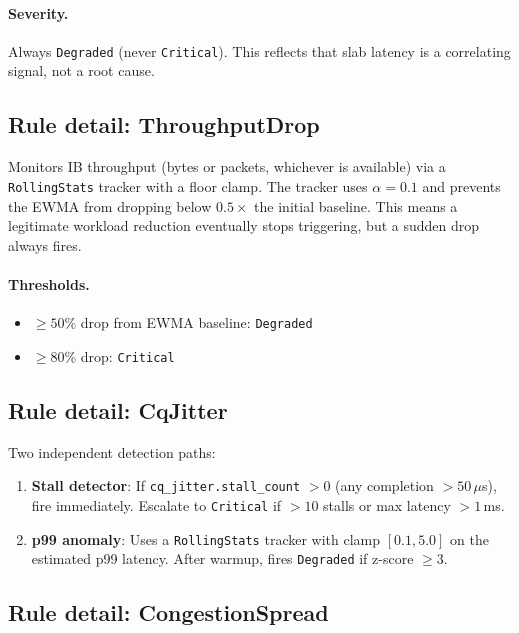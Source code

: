 \documentclass[11pt]{article}
\begin{document}
\paragraph{Severity.}
Always \texttt{Degraded} (never \texttt{Critical}). This reflects that slab
latency is a correlating signal, not a root cause.

\subsection{Rule detail: ThroughputDrop}

Monitors IB throughput (bytes or packets, whichever is available) via a
\texttt{RollingStats} tracker with a floor clamp. The tracker uses
$\alpha = 0.1$ and prevents the EWMA from dropping below $0.5\times$ the
initial baseline. This means a legitimate workload reduction eventually
stops triggering, but a sudden drop always fires.

\paragraph{Thresholds.}
\begin{itemize}[nosep]
  \item $\geq 50$\% drop from EWMA baseline: \texttt{Degraded}
  \item $\geq 80$\% drop: \texttt{Critical}
\end{itemize}

\subsection{Rule detail: CqJitter}

Two independent detection paths:

\begin{enumerate}[nosep]
  \item \textbf{Stall detector}: If \texttt{cq\_jitter.stall\_count} $> 0$
    (any completion $> 50\,\mu$s), fire immediately. Escalate to
    \texttt{Critical} if $> 10$ stalls or max latency $> 1$\,ms.
  \item \textbf{p99 anomaly}: Uses a \texttt{RollingStats} tracker with
    clamp $[0.1, 5.0]$ on the estimated p99 latency. After warmup, fires
    \texttt{Degraded} if z-score $\geq 3$.
\end{enumerate}

\subsection{Rule detail: CongestionSpread}
\end{document}
